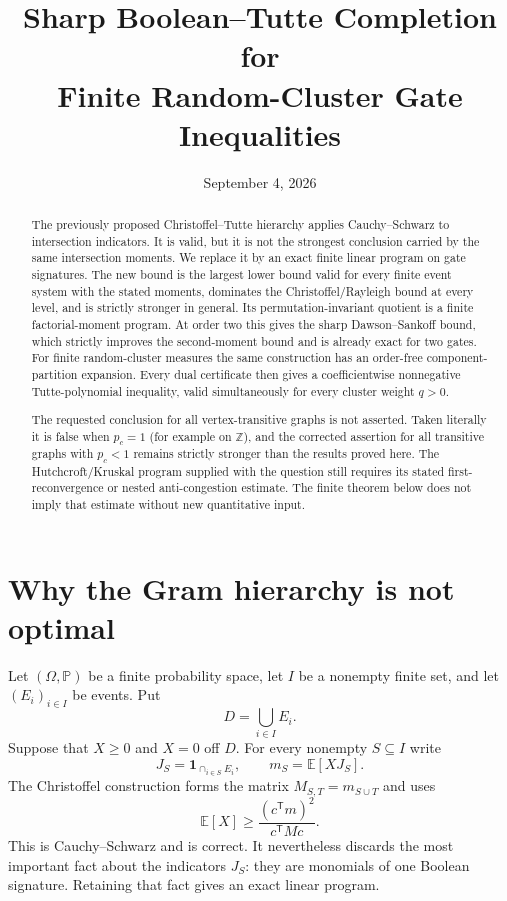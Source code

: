 \documentclass[11pt]{article}
\title{Sharp Boolean--Tutte Completion for\\Finite Random-Cluster Gate Inequalities}
\author{}
\date{September 4, 2026}
\theoremstyle{definition}
\theoremstyle{remark}
\newcommand{\E}{\mathbb E}
\newcommand{\Pp}{\mathbb P}
\newcommand{\one}{\mathbf 1}
\begin{document}
\maketitle

\begin{abstract}
The previously proposed Christoffel--Tutte hierarchy applies
Cauchy--Schwarz to intersection indicators.  It is valid, but it is not the
strongest conclusion carried by the same intersection moments.  We replace
it by an exact finite linear program on gate signatures.  The new bound is
the largest lower bound valid for every finite event system with the stated
moments, dominates the Christoffel/Rayleigh bound at every level, and is
strictly stronger in general.  Its permutation-invariant quotient is a
finite factorial-moment program.  At order two this gives the sharp
Dawson--Sankoff bound, which strictly improves the second-moment bound and
is already exact for two gates.  For finite random-cluster measures the
same construction has an order-free component-partition expansion.  Every
dual certificate then gives a coefficientwise nonnegative Tutte-polynomial
inequality, valid simultaneously for every cluster weight $q>0$.

The requested conclusion for all vertex-transitive graphs is not asserted.
Taken literally it is false when $p_c=1$ (for example on $\mathbb Z$), and
the corrected assertion for all transitive graphs with $p_c<1$ remains
strictly stronger than the results proved here.  The Hutchcroft/Kruskal
program supplied with the question still requires its stated
first-reconvergence or nested anti-congestion estimate.  The finite theorem
below does not imply that estimate without new quantitative input.
\end{abstract}

\section{Why the Gram hierarchy is not optimal}

Let $(\Omega,\Pp)$ be a finite probability space, let $I$ be a nonempty
finite set, and let $(E_i)_{i\in I}$ be events.  Put
\[
 D=\bigcup_{i\in I}E_i.
\]
Suppose that $X\geq0$ and $X=0$ off $D$.  For every nonempty $S\subseteq I$
write
\[
 J_S=\one_{\cap_{i\in S}E_i},\qquad
 m_S=\E[XJ_S].
\]
The Christoffel construction forms the matrix $M_{S,T}=m_{S\cup T}$ and
uses
\[
 \E[X]\geq \frac{(c^{\mathsf T}m)^2}{c^{\mathsf T}Mc}.
 \tag{1.1}
\]
This is Cauchy--Schwarz and is correct.  It nevertheless discards the most
important fact about the indicators $J_S$: they are monomials of one
Boolean signature.  Retaining that fact gives an exact linear program.
\end{document}
